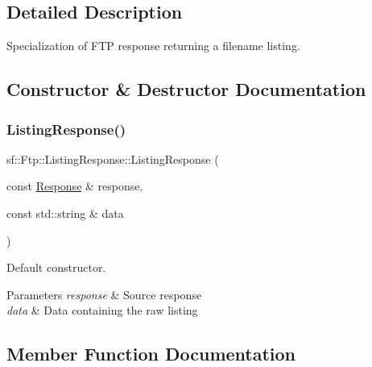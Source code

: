 \subsection{Detailed Description}
Specialization of F\+TP response returning a filename listing. 

\subsection{Constructor \& Destructor Documentation}
\mbox{\label{classsf_1_1_ftp_1_1_listing_response_a7e98d0aed70105c71adb52e5b6ce0bb8}} 
\subsubsection{\texorpdfstring{Listing\+Response()}{ListingResponse()}}
{\footnotesize\ttfamily sf\+::\+Ftp\+::\+Listing\+Response\+::\+Listing\+Response (\begin{DoxyParamCaption}\item[{const \hyperlink{classsf_1_1_ftp_1_1_response}{Response} \&}]{response,  }\item[{const std\+::string \&}]{data }\end{DoxyParamCaption})}



Default constructor. 


\begin{DoxyParams}{Parameters}
{\em response} & Source response \\
\hline
{\em data} & Data containing the raw listing \\
\hline
\end{DoxyParams}


\subsection{Member Function Documentation}
\mbox{\label{classsf_1_1_ftp_1_1_listing_response_a6cdcdfcc6a9008c7e1eddb48b164793d}} 
